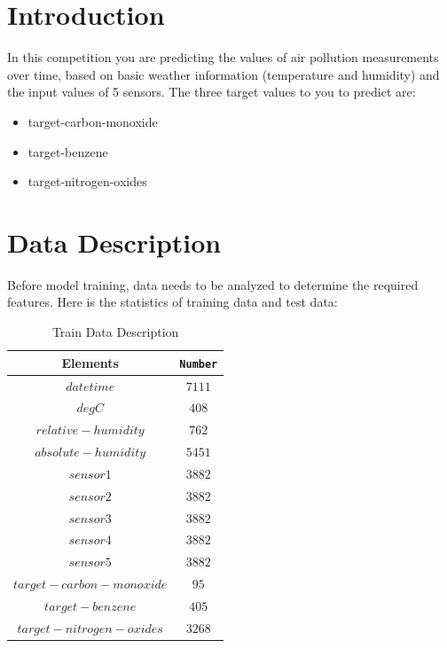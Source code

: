 \section{Introduction}\label{sec-intro}


In this competition you are predicting the values of air pollution measurements over time, 
based on basic weather information (temperature and humidity) and the input values of 5 sensors.
The three target values to you to predict are:
\begin{itemize}
	\item target-carbon-monoxide
	\item target-benzene
	\item target-nitrogen-oxides
\end{itemize}


\section{Data Description} \label{sec-preliminaries}
Before model training, data needs to be analyzed to determine the required features. Here is the statistics of training data and test data:
	
\begin{table}[H]  \centering
	\caption{Train Data Description}
	\label{tbl:Train Data Description}
		\begin{tabular}{c| c }
		\toprule
		Elements & \texttt{Number}  \\
		\midrule
		$date time$
		&  {$7111$} \\
		$deg C$
		&  {$408$} \\
		$relative-humidity$
		&  {$762$}  \\
		$absolute-humidity$
		&  {$5451$}  \\
		$sensor 1$
		&  {$3882$} \\
		$sensor 2$
		&  {$3882$} \\
		$sensor 3$
		&  {$3882$} \\
		$sensor 4$
		&  {$3882$} \\
		$sensor 5$
		&  {$3882$} \\
		$target-carbon-monoxide$
		&  {$95$} \\
		$target-benzene$
		&  {$405$} \\
		$target-nitrogen-oxides$
		&  {$3268$} \\
		\bottomrule
	\end{tabular}
\end{table}


